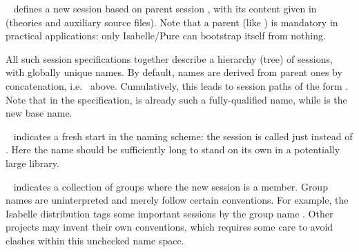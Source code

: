 \begin{isabellebody}
\begin{isamarkuptext}
  \begin{description}

  \item {}~ defines a new
  session  based on parent session , with its
  content given in  (theories and auxiliary source files).
  Note that a parent (like ) is mandatory in practical
  applications: only Isabelle/Pure can bootstrap itself from nothing.

  All such session specifications together describe a hierarchy (tree)
  of sessions, with globally unique names.  By default, names are
  derived from parent ones by concatenation, i.e.\ 
  above.  Cumulatively, this leads to session paths of the form .  Note that in the specification,
   is already such a fully-qualified name, while 
  is the new base name.

  \item {}~ indicates a fresh start
  in the naming scheme: the session is called just  instead
  of .  Here the name  should be
  sufficiently long to stand on its own in a potentially large
  library.

  \item {}~ indicates a
  collection of groups where the new session is a member.  Group names
  are uninterpreted and merely follow certain conventions.  For
  example, the Isabelle distribution tags some important sessions by
  the group name .  Other projects may invent their own
  conventions, which requires some care to avoid clashes within this
  unchecked name space.


\end{description}
\end{isamarkuptext}
\end{isabellebody}

